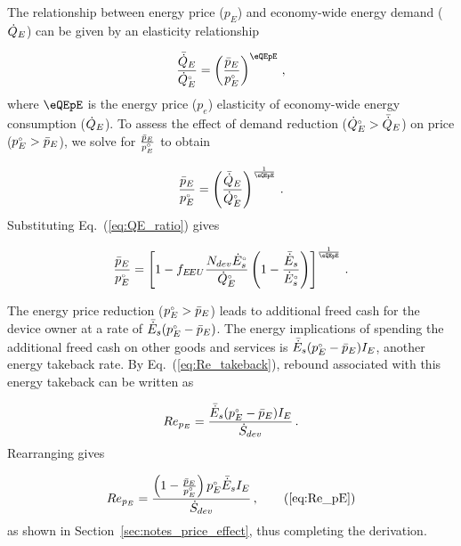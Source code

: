 The relationship between energy price ($p_E$) and
economy-wide energy demand ($\dot{Q}_E$)
can be given by an elasticity relationship

\begin{equation}
  \frac{\rainc{Q}_E}{\rorig{Q}_E} = 
          \left( \frac{\ainc{p}_E}{\orig{p}_E} \right)^{\eQEpE} \, ,
\end{equation}
%
where $\eQEpE$ is the energy price ($p_e$) elasticity
of economy-wide energy consumption ($\dot{Q}_E$).
To assess the effect of demand reduction
(${}{\dot{Q}}^{\scriptscriptstyle \circ}_E > \bar{\dot{Q}}_E$)
on price
(${}{p}^{\scriptscriptstyle \circ}_E > \bar{p}_E$),
we solve for $\frac{\bar{p}_E}{{}{p}^{\scriptscriptstyle \circ}_E}$
to obtain

\begin{equation}
  \frac{\ainc{p}_E}{\orig{p}_E} =
        \left( \frac{\rainc{Q}_E}{\rorig{Q}_E} \right)^{\frac{1}{\eQEpE}} \, .
\end{equation}
%
Substituting Eq.~(\ref{eq:QE_ratio}) gives

\begin{equation}
  \frac{\ainc{p}_E}{\orig{p}_E} =
        \left[ 1 - f_{\EEU} \frac{N_{dev} \rbempl{E}_s}{\rbempl{Q}_E} \left( 1 - \frac{\rainc{E}_s}{\rbempl{E}_s}  \right) \right]^{\frac{1}{\eQEpE}} \, .
\end{equation}

The energy price reduction (${}{p}^{\scriptscriptstyle \circ}_E > \bar{p}_E$)
leads to additional freed cash for the device owner at a rate of
$\bar{\dot{E}}_s ({}{p}^{\scriptscriptstyle \circ}_E - \bar{p}_E)$.
The energy implications of spending the additional freed cash
on other goods and services is
$\bar{\dot{E}}_s ({}{p}^{\scriptscriptstyle \circ}_E - \bar{p}_E) I_E$,
another energy takeback rate.
By Eq.~(\ref{eq:Re_takeback}),
rebound associated with this energy takeback
can be written as

\begin{equation}
  Re_{p_E} = \frac{\bar{\dot{E}}_s ({}{p}^{\scriptscriptstyle \circ}_E - \bar{p}_E) I_E}{\dot{S}_{dev}} \, .
\end{equation}
%
Rearranging gives

\begin{equation}
  Re_{p_E} = \frac{\left(1 - \frac{\ainc{p}_E}{\bempl{p}_E}\right) \orig{p}_E \rainc{E}_s I_E}{\Sdot} \, ,  \tag{\ref{eq:Re_pE}}
\end{equation}
%
as shown in Section~\ref{sec:notes_price_effect},
thus completing the derivation.



